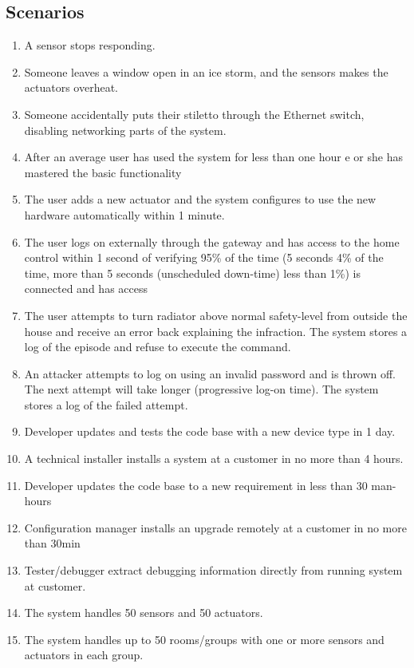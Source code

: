 \documentclass[a4paper,10pt]{article}
\begin{document}
\subsection{Scenarios}

\begin{enumerate}
\item A sensor stops responding.
\item Someone leaves a window open in an ice storm, and the sensors makes the actuators overheat.
\item Someone accidentally puts their stiletto through the Ethernet switch, disabling networking 
parts of the system.
\item After an average user has used the system for less than one hour e or she has mastered the basic functionality
\item The user adds a new actuator and the system configures to use the new hardware automatically within 1 minute.
\item The user logs on externally through the gateway and has access to the home control within 1 second of verifying 95\% of the time (5 seconds 4\% of the time, more than 5 seconds (unscheduled down-time) less than 1\%) is connected and has access
\item The user attempts to turn radiator above normal safety-level from outside the house and receive an error back explaining the infraction. The system stores a log of the episode and refuse to execute the command.
\item An attacker attempts to log on using an invalid password and is thrown off. The next attempt will take longer (progressive log-on time). The system stores a log of the failed attempt.
\item Developer updates and tests the code base with a new device type in 1 day.
\item A technical installer installs a system at a customer in no more than 4 hours.
\item Developer updates the code base to a new requirement in less than 30 man-hours
\item Configuration manager installs an upgrade remotely at a customer in no more than 30min
\item Tester/debugger extract debugging information directly from running system at customer.
\item The system handles 50 sensors and 50 actuators.
\item The system handles up to 50 rooms/groups with one or more sensors and actuators in each group.

\end{enumerate}
\end{document}
